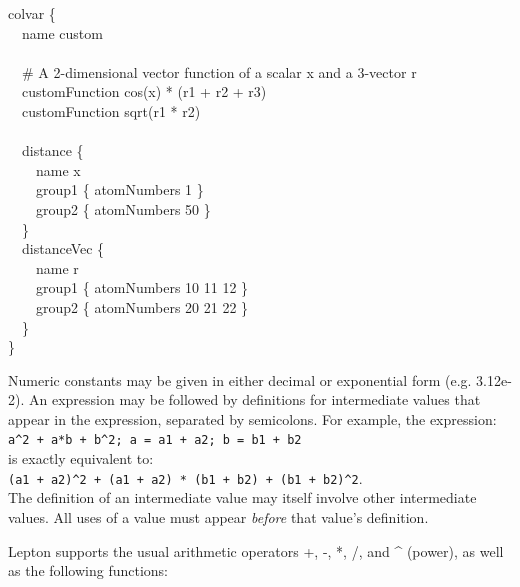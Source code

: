 {\begin{cvexampleinput}
\-colvar \{\\
\-~~name custom\\
\\
\-~~\# A 2-dimensional vector function of a scalar x and a 3-vector r\\
\-~~customFunction cos(x) * (r1 + r2 + r3)\\
\-~~customFunction sqrt(r1 * r2)\\
\\
\-~~distance \{\\
\-~~~~name x\\
\-~~~~group1 \{ atomNumbers 1 \}\\
\-~~~~group2 \{ atomNumbers 50 \}\\
\-~~\}\\
\-~~distanceVec \{\\
\-~~~~name r\\
\-~~~~group1 \{ atomNumbers 10 11 12 \}\\
\-~~~~group2 \{ atomNumbers  20 21 22 \}\\
\-~~\}\\
\}
\end{cvexampleinput}

Numeric constants may be given in either decimal or exponential form (e.g. 3.12e-2).
An expression may be followed by definitions for intermediate values that
appear in the expression, separated by semicolons.
For example, the expression:\\
\texttt{a\^{}2 + a*b + b\^{}2; a = a1 + a2; b = b1 + b2}\\
is exactly equivalent to:\\
\texttt{(a1 + a2)\^{}2 + (a1 + a2) * (b1 + b2) + (b1 + b2)\^{}2}.\\
The definition of an intermediate value may itself involve other intermediate values.
All uses of a value must appear \textit{before} that value's definition.

Lepton supports the usual arithmetic operators +, -, *, /, and \^{} (power), as well as the following functions:

}

